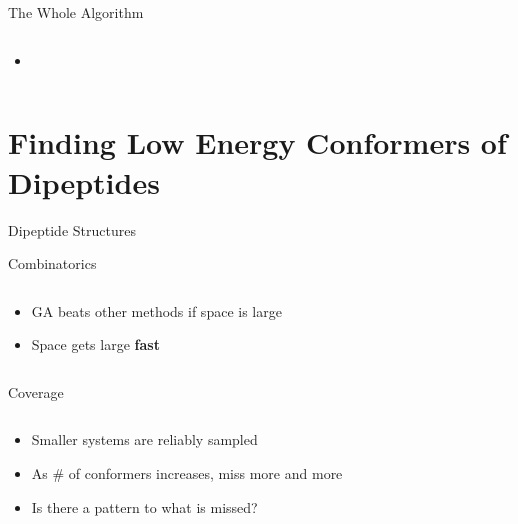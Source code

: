 \documentclass[10pt]{beamer}
\begin{document}
{{\begin{frame}{The Whole Algorithm}
\begin{columns}[c]
\begin{column}{0.48\textwidth}
\begin{itemize}
{				}
			    \item[]{

				}
			\end{itemize}
		\end{column}	
	\end{columns}
\end{frame}

\section{Finding Low Energy Conformers of Dipeptides}

{%
\begin{frame}{Dipeptide Structures}

\end{frame}
}

{%
\begin{frame}{Combinatorics}
	\begin{columns}[c] %
		\begin{column}{.4\textwidth}
			\begin{itemize}
				\item {GA beats other methods if space is large}
				\item {Space gets large \textbf{\alert{fast}}}
			\end{itemize}		
		\end{column}
		\hfill
		\begin{column}{0.6\textwidth}

		\end{column}	
	\end{columns}
\end{frame}
}

{%
\begin{frame}{Coverage}
	\begin{columns}[c] %
		\begin{column}{.4\textwidth}
			\begin{itemize}
				\item {Smaller systems are reliably sampled}
				\item {As \# of conformers increases, miss more and more}
				\item {Is there a pattern to what is missed?}
			\end{itemize}		
		\end{column}
		\hfill
		\begin{column}{0.6\textwidth}


\end{column}
\end{columns}
\end{frame}}}}
\end{document}
